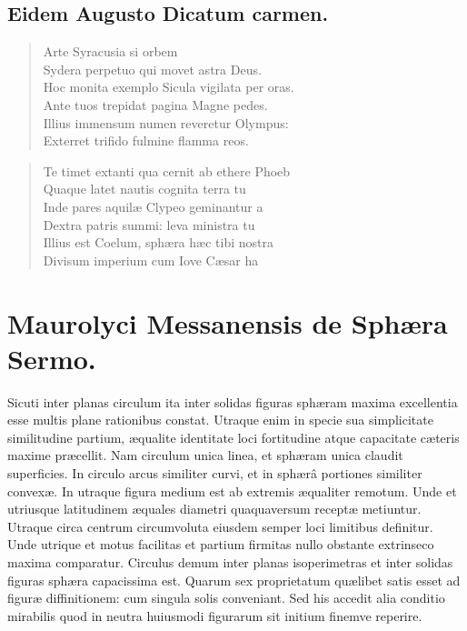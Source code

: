 \documentclass[11pt,a4paper]{article}
\begin{document}
\subsection*{Eidem Augusto Dicatum carmen.}

\begin{quote}
Arte Syracusia si   orbem\\
Sydera perpetuo qui movet astra Deus.\\
Hoc monita exemplo Sicula vigilata per oras.\\
Ante tuos trepidat pagina Magne pedes.\\
Illius immensum numen reveretur Olympus:\\
Exterret trifido fulmine flamma reos.
\end{quote}

\begin{quote}
Te timet extanti qua cernit ab ethere Phoeb\ill{}\\
Quaque latet nautis cognita terra tu\ill{}\\
Inde pares aquilæ Clypeo geminantur a\ill{}\\
Dextra patris summi: leva ministra tu\ill{}\\
Illius est Coelum, sphæra hæc tibi nostra\ill{}\\
Divisum imperium cum Iove Cæsar ha\ill{}
\end{quote}


\section*{Maurolyci Messanensis de Sphæra Sermo.}

Sicuti inter planas circulum ita inter solidas figuras sphæram maxima excellentia esse multis plane rationibus constat. Utraque enim in specie sua simplicitate similitudine partium, æqualite identitate loci fortitudine atque capacitate cæteris maxime præcellit.
Nam circulum unica linea, et sphæram unica claudit superficies. In circulo arcus similiter curvi, et in sphærâ portiones similiter convexæ. In utraque figura medium est ab extremis æqualiter remotum. Unde et utriusque latitudinem æquales diametri quaquaversum receptæ metiuntur. Utraque circa centrum circumvoluta eiusdem semper loci limitibus definitur. Unde utrique et motus facilitas et partium firmitas nullo obstante extrinseco maxima comparatur. Circulus demum inter planas isoperimetras et inter solidas figuras sphæra capacissima est. Quarum sex proprietatum quælibet satis esset ad figuræ diffinitionem: cum singula solis conveniant. Sed his accedit alia conditio mirabilis quod in neutra huiusmodi figurarum sit initium finemve reperire.
\end{document}

